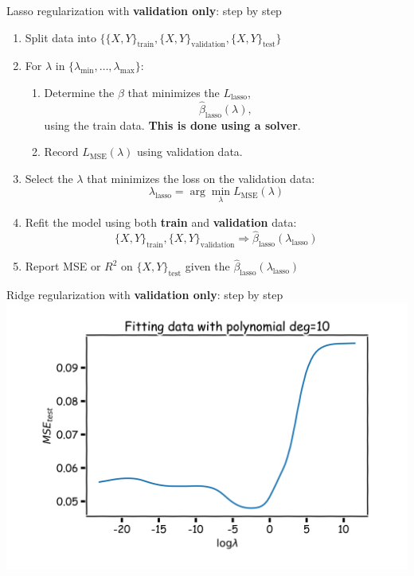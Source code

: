 \begin{frame}{Lasso regularization with \textbf{validation only}: step by step}
\begin{enumerate}
    \item Split data into $\{ \{X, Y\}_{\text{train}}, \{X, Y\}_{\text{validation}}, \{X, Y\}_{\text{test}} \}$
    \item For $\lambda$ in $\{\lambda_{\min}, \dots, \lambda_{\max}\}$:
    \begin{enumerate}
        \item Determine the $\beta$ that minimizes the $L_{\text{lasso}}$,
        \[
        \hat{\beta}_{\text{lasso}}(\lambda),
        \]
        using the train data. \textbf{This is done using a solver}.
        \item Record $L_{\text{MSE}}(\lambda)$ using validation data.
    \end{enumerate}
    \item Select the $\lambda$ that minimizes the loss on the validation data:
    \[
    \lambda_{\text{lasso}} = \arg\min_{\lambda} L_{\text{MSE}}(\lambda)
    \]
    \item Refit the model using both \textbf{train} and \textbf{validation} data:
    \[
    \{X, Y\}_{\text{train}}, \{X, Y\}_{\text{validation}} \Rightarrow \hat{\beta}_{\text{lasso}}(\lambda_{\text{lasso}})
    \]
    \item Report MSE or $R^2$ on $\{X, Y\}_{\text{test}}$ given the $\hat{\beta}_{\text{lasso}}(\lambda_{\text{lasso}})$
\end{enumerate}
\end{frame}


\begin{frame}{Ridge regularization with \textbf{validation only}: step by step}
\centering
\includegraphics[width=0.85\linewidth]{images/linear-regression/linear-regression-33.png}

\end{frame}


